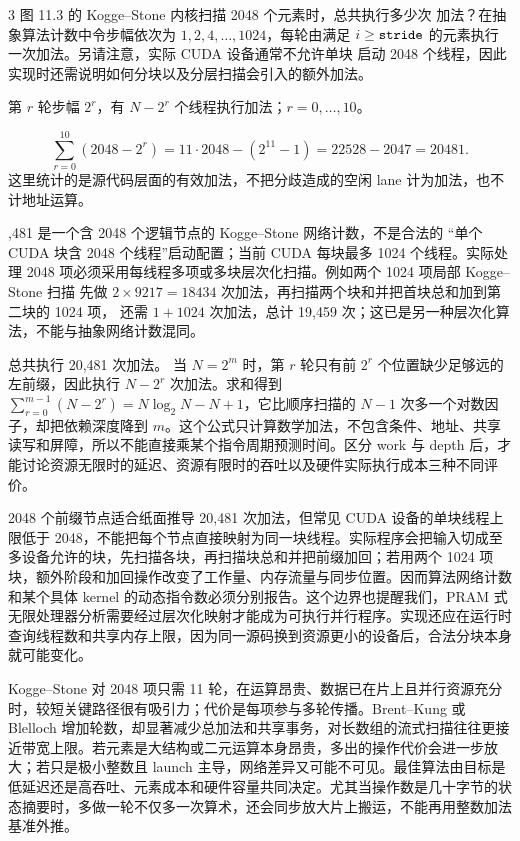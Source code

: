 \begin{solutionexercise}{3}
\problemheading 图 11.3 的 Kogge--Stone 内核扫描 2048 个元素时，总共执行多少次
加法？在抽象算法计数中令步幅依次为 $1,2,4,\ldots,1024$，每轮由满足
$i\ge\code{stride}$ 的元素执行一次加法。另请注意，实际 CUDA 设备通常不允许单块
启动 2048 个线程，因此实现时还需说明如何分块以及分层扫描会引入的额外加法。

\approachheading 第 $r$ 轮步幅 $2^r$，有 $N-2^r$ 个线程执行加法；$r=0,\ldots,10$。

\answerheading
\[
\sum_{r=0}^{10}(2048-2^r)
=11\cdot2048-(2^{11}-1)
=22528-2047
=\boxed{20481}.
\]
这里统计的是源代码层面的有效加法，不把分歧造成的空闲 lane 计为加法，也不计地址运算。

,481 是一个含 2048 个逻辑节点的 Kogge--Stone 网络计数，不是合法的
“单个 CUDA 块含 2048 个线程”启动配置；当前 CUDA 每块最多 1024 个线程。实际处理
2048 项必须采用每线程多项或多块层次化扫描。例如两个 1024 项局部 Kogge--Stone 扫描
先做 $2\times9217=18434$ 次加法，再扫描两个块和并把首块总和加到第二块的 1024 项，
还需 $1+1024$ 次加法，总计 19,459 次；这已是另一种层次化算法，不能与抽象网络计数混同。

\conclusionheading 总共执行 20,481 次加法。
\discussionheading
{}当 $N=2^m$ 时，第 $r$ 轮只有前 $2^r$ 个位置缺少足够远的左前缀，因此执行 $N-2^r$ 次加法。求和得到 $\sum_{r=0}^{m-1}(N-2^r)=N\log_2N-N+1$，它比顺序扫描的 $N-1$ 次多一个对数因子，却把依赖深度降到 $m$。这个公式只计算数学加法，不包含条件、地址、共享读写和屏障，所以不能直接乘某个指令周期预测时间。区分 work 与 depth 后，才能讨论资源无限时的延迟、资源有限时的吞吐以及硬件实际执行成本三种不同评价。

2048 个前缀节点适合纸面推导 20,481 次加法，但常见 CUDA 设备的单块线程上限低于 2048，不能把每个节点直接映射为同一块线程。实际程序会把输入切成至多设备允许的块，先扫描各块，再扫描块总和并把前缀加回；若用两个 1024 项块，额外阶段和加回操作改变了工作量、内存流量与同步位置。因而算法网络计数和某个具体 kernel 的动态指令数必须分别报告。这个边界也提醒我们，PRAM 式无限处理器分析需要经过层次化映射才能成为可执行并行程序。实现还应在运行时查询线程数和共享内存上限，因为同一源码换到资源更小的设备后，合法分块本身就可能变化。

Kogge--Stone 对 2048 项只需 11 轮，在运算昂贵、数据已在片上且并行资源充分时，较短关键路径很有吸引力；代价是每项参与多轮传播。Brent--Kung 或 Blelloch 增加轮数，却显著减少总加法和共享事务，对长数组的流式扫描往往更接近带宽上限。若元素是大结构或二元运算本身昂贵，多出的操作代价会进一步放大；若只是极小整数且 launch 主导，网络差异又可能不可见。最佳算法由目标是低延迟还是高吞吐、元素成本和硬件容量共同决定。尤其当操作数是几十字节的状态摘要时，多做一轮不仅多一次算术，还会同步放大片上搬运，不能再用整数加法基准外推。


\end{solutionexercise}
